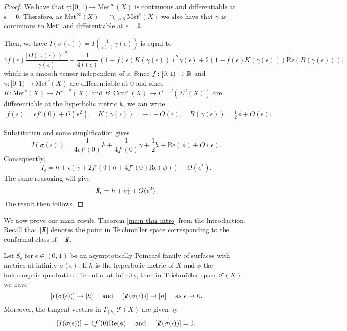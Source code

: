 \begin{proof}
We have that $\gamma:[0,1) \to \mathrm{Met}^\infty(X)$ is continuous and differentiable at $\epsilon = 0$. 
Therefore, as $\mathrm{Met}^\infty(X) = \cap_{s > 3} \mathrm{Met}^s(X)$ we also have that $\gamma$ is continuous to $\mathrm{Met}^s$ and differentiable at $\epsilon = 0$. 

Then, we have $I(\sigma(\epsilon)) = I(\frac{1}{f(\epsilon)} \gamma(\epsilon))$ is equal to 
\[
4 f(\epsilon) \frac{|B(\gamma(\epsilon))|^2}{\gamma(\epsilon)} + \frac{1}{4 f(\epsilon)}(1 - f(\epsilon) K(\gamma(\epsilon)))^2 \gamma(\epsilon) + 2(1 - f(\epsilon)K(\gamma(\epsilon)))\mathrm{Re}(B(\gamma(\epsilon))),
\]
which is a smooth tensor independent of $s$. 
Since $f:[0,1) \to \mathbb{R}$ and $\gamma:[0,1) \to \mathrm{Met}^s(X)$ are differentiable at 0 and since $K: \mathrm{Met}^s(X) \to H^{s-2}(X)$ and $B: \mathrm{Conf}^s(X) \to \Gamma^{s-2}(\Sigma^{2}(X))$ are differentiable at the hyperbolic metric $h$, we can write 
\begin{align*}
f(\epsilon) = \epsilon f'(0) + O(\epsilon^2), \quad
K(\gamma(\epsilon)) = -1 + O(\epsilon), \quad 
B(\gamma(\epsilon)) = \frac{1}{2} \phi + O(\epsilon).
\end{align*}

Substitution and some simplification gives 
\[
I(\sigma(\epsilon)) = \frac{1}{4\epsilon f'(0)} h + \frac{1}{4 f'(0)} \dot{\gamma} + \frac{1}{2} h + \mathrm{Re}(\phi) + O(\epsilon).
\]
Consequently, 
\[
I_\epsilon =  h + \epsilon(\dot{\gamma} + 2 f'(0)h + 4 f'(0) \mathrm{Re}(\phi)) + O(\epsilon^2).
\]
The same reasoning will give 
\[
I\!\!I_\epsilon = h + \epsilon \dot{\gamma} + O(\epsilon^2).
\]
The result then follows.
\end{proof}


We now prove our main result, Theorem \ref{main-thm-intro} from the Introduction. 
Recall that $[I\!\!I]$ denotes the point in Teichm\"uller space corresponding to the conformal class of $-I\!\!I$.


\begin{thm}\label{main-result}
Let $S_\epsilon$ for $\epsilon \in (0,1)$ be an asymptotically Poincar\'e family of surfaces with metrics at infinity $\sigma(\epsilon)$. 
If $h$ is the hyperbolic metric of $X$ and $\phi$  the holomorphic quadratic differential at infinity, then in Teichm\"uller space $\mathcal{T}(X)$ we have 
\[
[I(\sigma(\epsilon))] \to [h]
\quad \text{ and } \quad
[I\!\!I(\sigma(\epsilon))] \to [h]
\quad \text{ as } \epsilon \to 0.
\]
Moreover, the tangent vectors in $T_{[h]} \mathcal{T}(X)$ are given by 
\[
\dot{[I(\sigma(\epsilon))]}  = 4 f'(0) \mathrm{Re}(\phi) \quad \text{ and } \quad \dot{[I\!\!I(\sigma(\epsilon))]} = 0.
\]
\end{thm}

